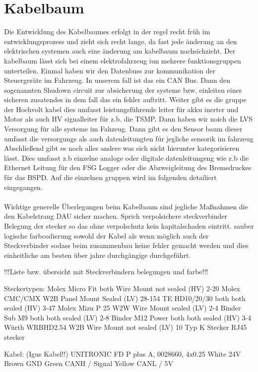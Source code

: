 \section{Kabelbaum}
Die Entwicklung des Kabelbaumes erfolgt in der regel recht früh im entwicklungsprozess und zieht sich recht lange, da fast jede änderung an den elektrischen systemen auch eine änderung am kabelbaum nachsichzieht. Der kabelbaum lässt sich bei einem elektrofahrzeug iun mehrere funktionsgruppen unterteilen. Einmal haben wir den Datenbuss zur kommunikation der Steuergeräte im Fahrzeug. In unserem fall ist das ein CAN Bus. Dann den sogenannten Shudown circuit zur absicherung der systeme bzw. einleiten eines sicheren zusatendes in dem fall das ein fehler auftritt. Weiter gibt es die gruppe der Hochvolt kabel dies umfasst leistungsführende leiter für akku inerter und Motor als auch HV signalleiter für z.b. die TSMP. Dann haben wir noich die LVS Versorgung für alle systeme im Fahzeug. Dann gibt es den Sensor baum dieser umfasst die versorgungs als auch datenleitungten für jegliche sensorik im fahrzeug  Abschließend gibt es noch alles andere was sich nicht hierunter kategorisieren lässt. Dies umfasst z.b einzelne analoge oder digitale datenleitungeng wie z.b die Ethernet Leitung für den FSG Logger oder die Abzweigleitung des Bremsdruckes für das BSPD. Auf die einzelnen gruppen wird im folgenden detailiert eingegangen.\\
\\
Wichtige generelle Überlegungen beim Kabelbaum sind jegliche Maßnahmen die den Kabelstrang DAU sicher machen. Sprich verpolsichere steckverbinder Belegung der stecker so das ohne verpolschutz kein kapitalschaden eintritt. sauber logische farbcodierung sowohl der Kabel als wenn möglich auch der Steckverbinder sodass beim zusammenbau keine fehler gemacht werden und dies einheitliche am besten über jahre durchgängige durchgeführt.

!!!Liste bzw. übersicht mit Steckverbindern belegungen und farbe!!!

Steckertypen:		
Molex Micro Fit 	both 	Wire Mount	not sealed 	(HV)	2-20
Molex CMC/CMX 		W2B 	Panel Mount	Sealed 		(LV)	28-154
TE HD10/20/30 		both 	both		sealed 		(HV)	3-47
Molex Mizu P 25 	W2W 	Wire Mount	sealed 		(LV)	2-4
Binder Sub M9 		both 	both		sealed 		(LV)	2-8
Binder M12 Power	both	both		sealed		(HV) 	3-4
Würth WRBHD2.54		W2B	Wire Mount	not sealed	(LV)	10
Typ K Stecker
RJ45 stecker

Kabel: (Igus Kabel!!)
UNITRONIC FD P plus A, 0028660, 4x0.25
White 24V
Brown GND
Green CANH / Signal
Yellow CANL / 5V

